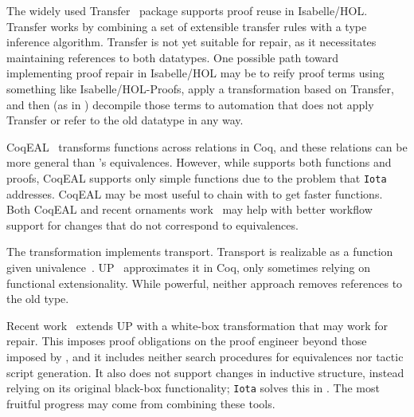 
The widely used Transfer~\cite{Huffman2013} package supports proof reuse in Isabelle/HOL. %
Transfer works by combining a set of extensible transfer rules with a type inference algorithm.
Transfer is not yet suitable for repair, as it necessitates maintaining references to both datatypes.
One possible path toward implementing proof repair in Isabelle/HOL may be to reify proof terms using something like
Isabelle/HOL-Proofs, apply a transformation based on Transfer, and then (as in \toolname) decompile those terms to automation that does not apply Transfer or refer to the old datatype in any way.

CoqEAL~\cite{cohen:hal-01113453} transforms functions across relations in Coq,
and these relations can be more general than \toolnamec's equivalences.
However, while \toolnamec supports both functions and proofs, CoqEAL supports only simple functions
due to the problem that \lstinline{Iota} addresses.
CoqEAL may be most useful to chain with \toolnamec to get faster functions.
Both CoqEAL and recent ornaments work~\cite{williamsphd} may help with
better workflow support for changes that do not correspond to equivalences.

The \toolnamec transformation implements transport.
Transport is realizable as a function given univalence~\cite{univalent2013homotopy}.
UP~\cite{tabareau2017equivalences} approximates it
in Coq, only sometimes relying on functional extensionality.
While powerful, neither approach removes references to the old type. %

Recent work~\cite{tabareau2019marriage} extends UP with 
a white-box transformation that may work for repair.
This imposes proof obligations on the proof engineer beyond those imposed by \toolname,
and it includes neither search procedures for equivalences nor tactic script generation.
It also does not support changes in inductive structure,
instead relying on its original black-box functionality;
\lstinline{Iota} solves this in \toolname. %
The most fruitful progress may come from combining these tools. %

